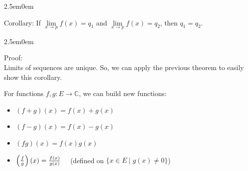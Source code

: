 \documentclass{book}
\newcommand{\hThree}{%
   \color{PineGreen}
   \fontsize{13}{15}\selectfont%
}
\newenvironment{myIndent}{%
   \begin{adjustwidth}{2.5em}{0em}%
}{%
   \end{adjustwidth}%
}
\newcommand{\retTwo}{\hfill\bigbreak}
\newcommand{\myHS}{ \hspace{0.5em}}
\begin{document}
{\begin{myIndent}
      Corollary: If $\lim\limits_{x\rightarrow p}f(x) = q_1$ and $\lim\limits_{x\rightarrow p}f(x) = q_2$, then $q_1 = q_2$.

      {\begin{myIndent} \hThree
         Proof:\\
         Limits of sequences are unique. So, we can apply the previous theorem to easily show this corollary. \retTwo
      \end{myIndent}}
   \end{myIndent}}

   For functions $f, g: E \rightarrow \mathbb{C}$, we can build new functions:
   \begin{itemize}
      \item $(f + g)(x) = f(x) + g(x)$
      \item $(f - g)(x) = f(x) - g(x)$
      \item $(fg)(x) = f(x)g(x)$
      \item $\left(\frac{f}{g}\right)(x) = \frac{f(x)}{g(x)} \myHS\myHS$ (defined on $\{x \in E \mid g(x) \neq 0\}$)
   \end{itemize}

   \newpage
\end{document}
